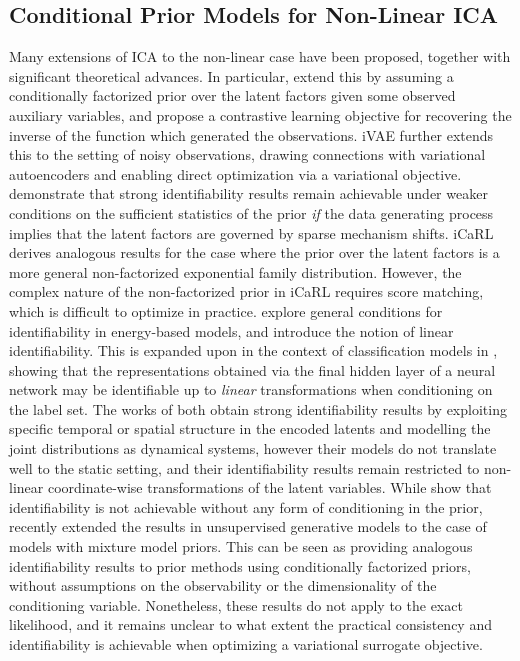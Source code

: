 \documentclass[10pt]{article} %
\theoremstyle{plain}
\theoremstyle{definition}
\begin{document}
\subsection{Conditional Prior Models for Non-Linear ICA}
Many extensions of ICA to the non-linear case have been proposed, together with significant theoretical advances. In particular, \citet{hyvarinen2019nonlinear} extend this by assuming a conditionally factorized prior over the latent factors given some observed auxiliary variables, and propose a contrastive learning objective for recovering the inverse of the function which generated the observations.
iVAE \citep{Khemakhem_Kingma_Monti_Hyvarinen_2020} further extends this to the setting of noisy observations, drawing connections with variational autoencoders \citep{kingma2013auto} and enabling direct optimization via a variational objective. \citet{Lachapelle_López_Sharma_Everett_Priol_Lacoste_Lacoste-Julien_2022} demonstrate that strong identifiability results remain achievable under weaker conditions on the sufficient statistics of the prior \textit{if} the data generating process implies that the latent factors are governed by sparse mechanism shifts.
iCaRL \citep{Lu_Wu_Hernandez-Lobato_Scholkopf_2022} derives analogous results for the case where the prior over the latent factors is a more general non-factorized exponential family distribution. However, the complex nature of the non-factorized prior in iCaRL requires score matching, which is difficult to optimize in practice. \citet{khemakhem2020ice} explore general conditions for identifiability in energy-based models, and introduce the notion of linear identifiability. This is expanded upon in the context of classification models in \citet{Roeder_Metz_Kingma_2021}, showing that the representations obtained via the final hidden layer of a neural network may be identifiable up to \textit{linear} transformations when conditioning on the label set.
The works of \citet{halva2021disentangling, morioka2021independent} both obtain strong identifiability results by exploiting specific temporal or spatial structure in the encoded latents and modelling the joint distributions as dynamical systems, however their models do not translate well to the static setting, and their identifiability results remain restricted to non-linear coordinate-wise transformations of the latent variables. 
While \citet{Hyvärinen_Pajunen_1999, Khemakhem_Kingma_Monti_Hyvarinen_2020} show that identifiability is not achievable without any form of conditioning in the prior, \citet{Willetts_Paige_2022,Kivva_Rajendran_Ravikumar_Aragam_2022} recently extended the results in unsupervised generative models to the case of models with mixture model priors. This can be seen as providing analogous identifiability results to prior methods using conditionally factorized priors, without assumptions on the observability or the dimensionality of the conditioning variable. Nonetheless, these results do not apply to the exact likelihood, and it remains unclear to what extent the practical consistency and identifiability is achievable when optimizing a variational surrogate objective. 
\end{document}
